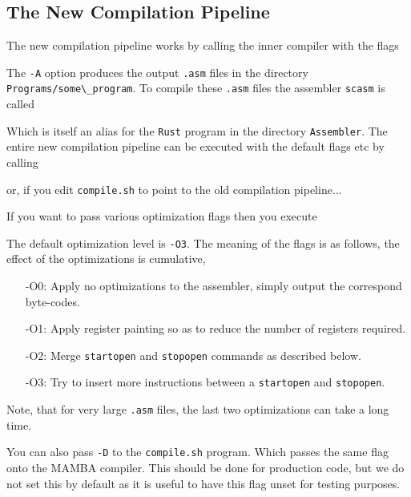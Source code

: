 \subsection{The New Compilation Pipeline}
\label{sec:newcompiler}
The new compilation pipeline works by calling the inner compiler with the flags


\noindent The \verb|-A| option produces the output \verb+.asm+ files in the directory
\verb+Programs/some\_program+.
To compile these \verb+.asm+ files the assembler \verb+scasm+ is called


\noindent Which is itself an alias for the \verb+Rust+ program in the directory \verb+Assembler+.
The entire new compilation pipeline can be executed with the default 
flags etc by calling


\noindent or, if you edit \verb+compile.sh+ to point to the old compilation
pipeline...


\vspace{5mm}

\noindent If you want to pass various optimization flags then you
execute


\noindent The default optimization level is \verb+-O3+.
The meaning of the flags is as follows, the effect of
the optimizations is cumulative,
\begin{itemize}
\item[-O0:] Apply no optimizations to the assembler, simply
output the correspond byte-codes.
\item[-O1:] Apply register painting so as to reduce the number
of registers required.
\item[-O2:] Merge \verb+startopen+ and \verb+stopopen+ commands
as described below.
\item[-O3:] Try to insert more instructions between a
\verb+startopen+ and \verb+stopopen+.
\end{itemize}
Note, that for very large \verb+.asm+ files, the last
two optimizations can take a long time.

You can also pass \verb+-D+ to the \verb+compile.sh+ program.
Which passes the same flag onto the MAMBA compiler. This should
be done for production code, but we do not set this by default
as it is useful to have this flag unset for testing purposes.

